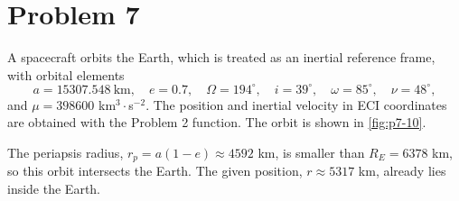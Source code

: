 \section{Problem 7}
\label{sec:problem7}

A spacecraft orbits the Earth, which is treated as an inertial reference frame, with orbital elements
\[
a = 15307.548\ \text{km}, \quad e = 0.7, \quad \Omega = 194^\circ, \quad i = 39^\circ, \quad \omega = 85^\circ, \quad \nu = 48^\circ,
\]
and $\mu = 398600$ km$^3\cdot$s$^{-2}$. The position and inertial velocity in ECI coordinates are obtained with the Problem 2 function. The orbit is shown in \cref{fig:p7-10}.


\noindent The periapsis radius, $r_p = a(1-e) \approx 4592$ km, is smaller than $R_E = 6378$ km, so this orbit intersects the Earth. The given position, $r \approx 5317$ km, already lies inside the Earth.

\FloatBarrier
